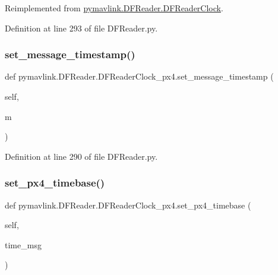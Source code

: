 Reimplemented from \mbox{\hyperlink{classpymavlink_1_1DFReader_1_1DFReaderClock_a49037f269d69afa423bc7c4a5e1983ba}{pymavlink.\+D\+F\+Reader.\+D\+F\+Reader\+Clock}}.



Definition at line 293 of file D\+F\+Reader.\+py.

\mbox{\label{classpymavlink_1_1DFReader_1_1DFReaderClock__px4_aa489a357b826b628cf3df17231ad9e8e}} 
\subsubsection{\texorpdfstring{set\_message\_timestamp()}{set\_message\_timestamp()}}
{\footnotesize\ttfamily def pymavlink.\+D\+F\+Reader.\+D\+F\+Reader\+Clock\+\_\+px4.\+set\+\_\+message\+\_\+timestamp (\begin{DoxyParamCaption}\item[{}]{self,  }\item[{}]{m }\end{DoxyParamCaption})}



Definition at line 290 of file D\+F\+Reader.\+py.

\mbox{\label{classpymavlink_1_1DFReader_1_1DFReaderClock__px4_aff4c8d2386feb420eb1e53498c2f5ed6}} 
\subsubsection{\texorpdfstring{set\_px4\_timebase()}{set\_px4\_timebase()}}
{\footnotesize\ttfamily def pymavlink.\+D\+F\+Reader.\+D\+F\+Reader\+Clock\+\_\+px4.\+set\+\_\+px4\+\_\+timebase (\begin{DoxyParamCaption}\item[{}]{self,  }\item[{}]{time\+\_\+msg }\end{DoxyParamCaption})}



